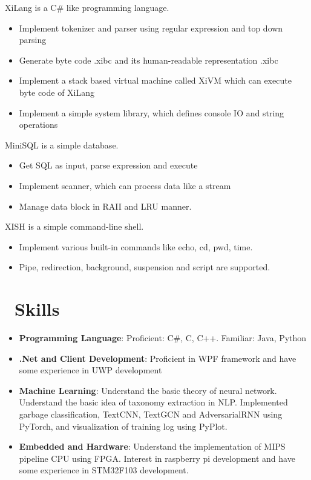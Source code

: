 \documentclass{resume}
\begin{document}
XiLang is a C\# like programming language.
\begin{itemize}
  \item Implement tokenizer and parser using regular expression and top down parsing
  \item Generate byte code .xibc and its human-readable representation .xibc
  \item Implement a stack based virtual machine called XiVM which can execute byte code of XiLang
  \item Implement a simple system library, which defines console IO and string operations
\end{itemize}

MiniSQL is a simple database.
\begin{itemize}
  \item Get SQL as input, parse expression and execute
  \item Implement scanner, which can process data like a stream
  \item Manage data block in RAII and LRU manner.
\end{itemize}

XISH is a simple command-line shell.
\begin{itemize}
  \item Implement various built-in commands like echo, cd, pwd, time.
  \item Pipe, redirection, background, suspension and script are supported.
\end{itemize}

\section{\faCogs\ Skills}
\begin{itemize}[parsep=0.25ex]
    \item \textbf{Programming Language}:
        Proficient: C\#, C, C++. Familiar: Java, Python

    \item \textbf{.Net and Client Development}:
        Proficient in WPF framework and have some experience in UWP development

    \item \textbf{Machine Learning}:
        Understand the basic theory of neural network. Understand the basic idea of taxonomy extraction in NLP.
        Implemented garbage classification, TextCNN, TextGCN and AdversarialRNN using PyTorch,
        and visualization of training log using PyPlot.
    
    \item \textbf{Embedded and Hardware}:
        Understand the implementation of MIPS pipeline CPU using FPGA.
        Interest in raspberry pi development and have some experience in STM32F103 development.
\end{itemize}
\end{document}
